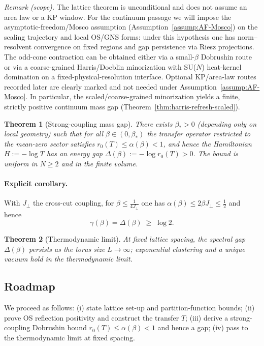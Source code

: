 \documentclass[11pt]{amsart}
\theoremstyle{plain}
\newtheorem{theorem}{Theorem}[section]
\theoremstyle{definition}
\theoremstyle{remark}
\begin{document}
\noindent\emph{Remark (scope).} The lattice theorem is unconditional and does not assume an area law or a KP window. For the continuum passage we will impose the asymptotic-freedom/Mosco assumption (Assumption~\ref{assump:AF-Mosco}) on the scaling trajectory and local OS/GNS forms: under this hypothesis one has norm--resolvent convergence on fixed regions and gap persistence via Riesz projections. The odd-cone contraction can be obtained either via a small-$\beta$ Dobrushin route or via a coarse-grained Harris/Doeblin minorization with SU($N$) heat-kernel domination on a fixed-physical-resolution interface. Optional KP/area-law routes recorded later are clearly marked and not needed under Assumption~\ref{assump:AF-Mosco}. In particular, the scaled/coarse-grained minorization yields a finite, strictly positive continuum mass gap (Theorem~\ref{thm:harris-refresh-scaled}).

\begin{theorem}[Strong-coupling mass gap] \label{thm:gap}
There exists $\beta_*>0$ (depending only on local geometry) such that for all $\beta\in (0,\beta_*)$ the transfer operator restricted to the mean-zero sector satisfies $r_0(T)\le \alpha(\beta)<1$, and hence the Hamiltonian $H:=-\log T$ has an energy gap $\Delta(\beta):=-\log r_0(T)>0$. The bound is uniform in $N\ge 2$ and in the finite volume.
\end{theorem}

\paragraph{Explicit corollary.}
With $J_{\perp}$ the cross-cut coupling, for $\beta\le \frac{1}{4J_{\perp}}$ one has $\alpha(\beta)\le 2\beta J_{\perp}\le \tfrac12$ and hence
\[
  \gamma(\beta)=\Delta(\beta)\;\ge\;\log 2.
\]

\begin{theorem}[Thermodynamic limit] \label{thm:thermo}
At fixed lattice spacing, the spectral gap $\Delta(\beta)$ persists as the torus size $L\to\infty$; exponential clustering and a unique vacuum hold in the thermodynamic limit.
\end{theorem}

\subsection{Roadmap}

We proceed as follows: (i) state lattice set-up and partition-function bounds; (ii) prove OS reflection positivity and construct the transfer $T$; (iii) derive a strong-coupling Dobrushin bound $r_0(T)\le \alpha(\beta)<1$ and hence a gap; (iv) pass to the thermodynamic limit at fixed spacing.
\end{document}
